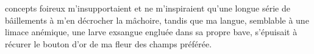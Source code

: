 concepts foireux m’insupportaient et ne m’inspiraient qu’une longue série de bâillements à m’en décrocher la mâchoire, tandis que ma langue, semblable à une limace anémique, une larve exsangue engluée dans sa propre bave, s’épuisait à récurer le bouton d’or de ma fleur des champs préférée.

\vfill
{}
